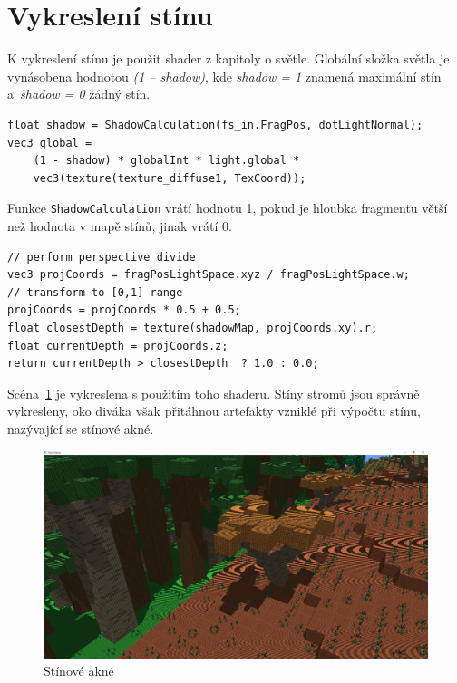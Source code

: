\documentclass[thesis=M,czech]{FITthesis}[2019/12/23]
\begin{document}
\section{Vykreslení stínu}

K vykreslení stínu je použit shader z kapitoly o světle. Globální složka světla je vynásobena hodnotou \textit{(1 -- shadow)}, kde \textit{shadow = 1} znamená maximální stín a~\textit{shadow = 0} žádný stín.

\begin{verbatim}
float shadow = ShadowCalculation(fs_in.FragPos, dotLightNormal);
vec3 global = 
    (1 - shadow) * globalInt * light.global * 
    vec3(texture(texture_diffuse1, TexCoord));
\end{verbatim}

Funkce \texttt{ShadowCalculation} vrátí hodnotu 1, pokud je hloubka fragmentu větší než hodnota v mapě stínů, jinak vrátí 0.

\begin{verbatim}
// perform perspective divide
vec3 projCoords = fragPosLightSpace.xyz / fragPosLightSpace.w;
// transform to [0,1] range
projCoords = projCoords * 0.5 + 0.5;
float closestDepth = texture(shadowMap, projCoords.xy).r; 
float currentDepth = projCoords.z;
return currentDepth > closestDepth  ? 1.0 : 0.0;
\end{verbatim}

Scéna~\ref{fig:shadows_acne} je vykreslena s použitím toho shaderu. Stíny stromů jsou správně vykresleny, oko diváka však přitáhnou artefakty vzniklé při výpočtu stínu, nazývající se stínové akné.

\begin{figure}\centering
	\includegraphics[width=\textwidth]{images/shadows/acne}
	\caption[Stínové akné]{Stínové akné}\label{fig:shadows_acne}
\end{figure}
\end{document}
